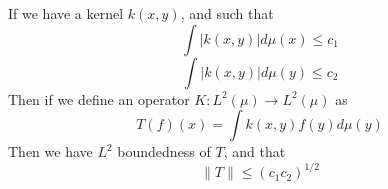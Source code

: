 \begin{proposition}
    If we have a kernel $k(x,y)$, and such that
    \begin{equation*}
        \int|k(x,y)|d\mu(x)\leq c_1
    \end{equation*}
    \begin{equation*}
        \int|k(x,y)|d\mu(y)\leq c_2
    \end{equation*}
    Then if we define an operator $K:L^2(\mu)\to L^2(\mu)$ as
    \begin{equation*}
        T(f)(x)=\int k(x,y)f(y)d\mu(y)
    \end{equation*}
    Then we have $L^2$ boundedness of $T$, and that
    \begin{equation*}
        \|T\|\leq(c_1c_2)^{1/2}
    \end{equation*}
\end{proposition}


